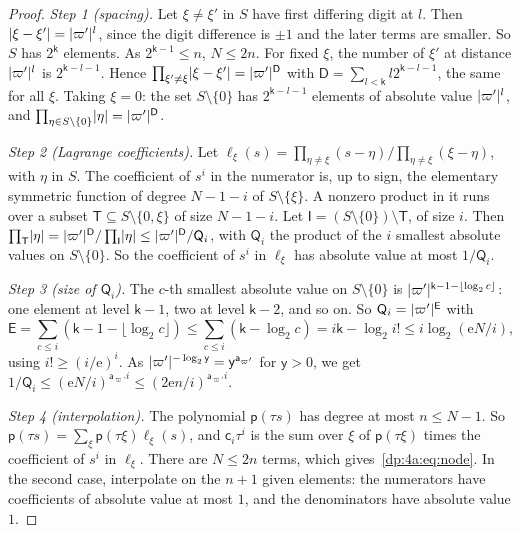\begin{proof}
\emph{Step 1 (spacing).} Let $\xi\ne\xi'$ in $S$ have first differing digit at $l$. Then $\lvert \xi-\xi'\rvert=\lvert \varpi'\rvert^l$, since the digit difference is $\pm1$ and the later terms are smaller. So $S$ has $2^{\mathsf k}$ elements. As $2^{\mathsf k-1}\le n$, $N\le2n$. For fixed $\xi$, the number of $\xi'$ at distance $\lvert \varpi'\rvert^l$ is $2^{\mathsf k-l-1}$. Hence $\prod_{\xi'\ne\xi}\lvert \xi-\xi'\rvert=\lvert \varpi'\rvert^{\mathsf D}$ with $\mathsf D=\sum_{l<\mathsf k}l2^{\mathsf k-l-1}$, the same for all $\xi$. Taking $\xi=0$: the set $S\setminus\{0\}$ has $2^{\mathsf k-l-1}$ elements of absolute value $\lvert \varpi'\rvert^l$, and $\prod_{\eta\in S\setminus\{0\}}\lvert \eta\rvert=\lvert \varpi'\rvert^{\mathsf D}$.

\emph{Step 2 (Lagrange coefficients).} Let $\ell_\xi(s)=\prod_{\eta\ne\xi}(s-\eta)/\prod_{\eta\ne\xi}(\xi-\eta)$, with $\eta$ in $S$. The coefficient of $s^i$ in the numerator is, up to sign, the elementary symmetric function of degree $N-1-i$ of $S\setminus\{\xi\}$. A nonzero product in it runs over a subset $\mathsf T\subseteq S\setminus\{0,\xi\}$ of size $N-1-i$. Let $\mathsf I=(S\setminus\{0\})\setminus\mathsf T$, of size $i$. Then $\prod_{\mathsf T}\lvert \eta\rvert=\lvert \varpi'\rvert^{\mathsf D}/\prod_{\mathsf I}\lvert \eta\rvert\le\lvert \varpi'\rvert^{\mathsf D}/\mathsf Q_i$, with $\mathsf Q_i$ the product of the $i$ smallest absolute values on $S\setminus\{0\}$. So the coefficient of $s^i$ in $\ell_\xi$ has absolute value at most $1/\mathsf Q_i$.

\emph{Step 3 (size of $\mathsf Q_i$).} The $c$-th smallest absolute value on $S\setminus\{0\}$ is $\lvert \varpi'\rvert^{\mathsf k-1-\lfloor\log_2c\rfloor}$: one element at level $\mathsf k-1$, two at level $\mathsf k-2$, and so on. So $\mathsf Q_i=\lvert \varpi'\rvert^{\mathsf E}$ with
\[
 \mathsf E=\sum_{c\le i}(\mathsf k-1-\lfloor\log_2c\rfloor)\le\sum_{c\le i}(\mathsf k-\log_2c)=i\mathsf k-\log_2i!\le i\log_2(\mathrm eN/i),
\]
using $i!\ge(i/\mathrm e)^i$. As $\lvert \varpi'\rvert^{-\log_2\mathsf y}=\mathsf y^{\mathsf a_{\varpi'}}$ for $\mathsf y>0$, we get $1/\mathsf Q_i\le(\mathrm eN/i)^{\mathsf a_{\varpi'} i}\le(2\mathrm en/i)^{\mathsf a_{\varpi'} i}$.

\emph{Step 4 (interpolation).} The polynomial $\mathsf p(\tau s)$ has degree at most $n\le N-1$. So $\mathsf p(\tau s)=\sum_\xi\mathsf p(\tau\xi)\ell_\xi(s)$, and $\mathsf c_i\tau^i$ is the sum over $\xi$ of $\mathsf p(\tau\xi)$ times the coefficient of $s^i$ in $\ell_\xi$. There are $N\le2n$ terms, which gives~\eqref{dp:4a:eq:node}. In the second case, interpolate on the $n+1$ given elements: the numerators have coefficients of absolute value at most $1$, and the denominators have absolute value $1$.
\end{proof}


